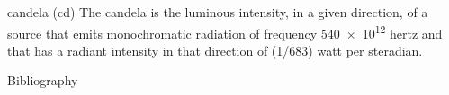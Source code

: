 \documentclass[avery5371,grid]{flashcards}
\begin{document}
\begin{flashcard}[Definitions]{candela (cd)}
\vspace{\fill}
The candela is the luminous intensity, in a given direction, of a source that emits monochromatic radiation of frequency \num{540e12} hertz and that has a radiant intensity in that direction of (1/683) watt per steradian.\cite{sp330}
\vspace{\fill}
\end{flashcard}


\begin{flashcard}[]{Bibliography}
    \printbibliography
\end{flashcard}
\end{document}

